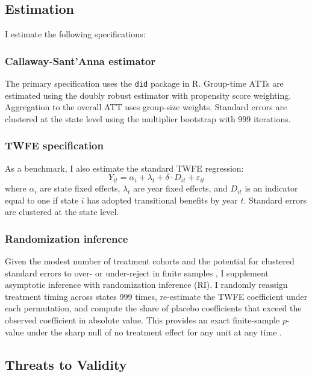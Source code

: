 \documentclass[12pt]{article}
\begin{document}
\subsection{Estimation}

I estimate the following specifications:

\subsubsection*{Callaway-Sant'Anna estimator} The primary specification uses the \citet{callaway2021difference} \texttt{did} package in R. Group-time ATTs are estimated using the doubly robust estimator with propensity score weighting. Aggregation to the overall ATT uses group-size weights. Standard errors are clustered at the state level using the multiplier bootstrap with 999 iterations.

\subsubsection*{TWFE specification} As a benchmark, I also estimate the standard TWFE regression:
\begin{equation}
Y_{it} = \alpha_i + \lambda_t + \delta \cdot D_{it} + \varepsilon_{it}
\label{eq:twfe}
\end{equation}
where $\alpha_i$ are state fixed effects, $\lambda_t$ are year fixed effects, and $D_{it}$ is an indicator equal to one if state $i$ has adopted transitional benefits by year $t$. Standard errors are clustered at the state level.

\subsubsection*{Randomization inference} Given the modest number of treatment cohorts and the potential for clustered standard errors to over- or under-reject in finite samples \citep{mackinnon2022cluster}, I supplement asymptotic inference with randomization inference (RI). I randomly reassign treatment timing across states 999 times, re-estimate the TWFE coefficient under each permutation, and compute the share of placebo coefficients that exceed the observed coefficient in absolute value. This provides an exact finite-sample $p$-value under the sharp null of no treatment effect for any unit at any time \citep{fisher1935design, hess2017randomization}.

\subsection{Threats to Validity}
\end{document}
